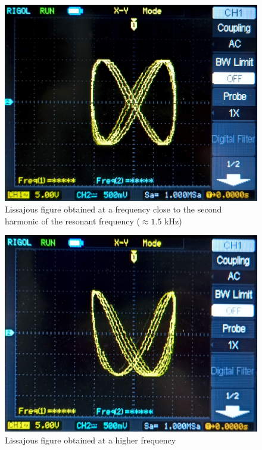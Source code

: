 \begin{figure}[H]
    \centering
    \includegraphics[width=0.75\columnwidth]{images/l3.jpg}
    \caption{Lissajous figure obtained at a frequency close to the second harmonic of the resonant frequency ($\approx 1.5$ kHz)}
    \label{l3}
\end{figure}

\begin{figure}[H]
    \centering
    \includegraphics[width=0.75\columnwidth]{images/l4.jpg}
    \caption{Lissajous figure obtained at a higher frequency}
    \label{l4}
\end{figure}